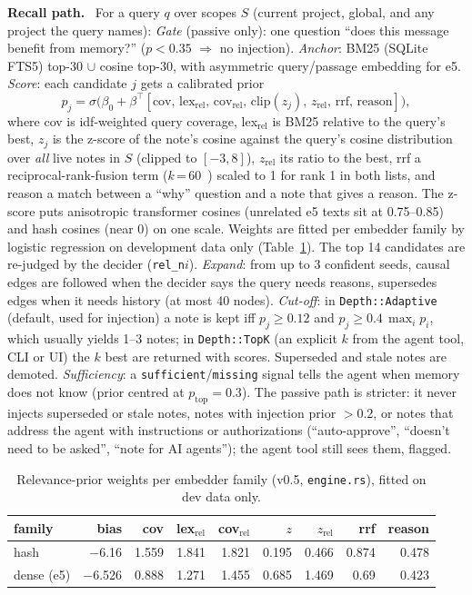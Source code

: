 \documentclass[10pt,twocolumn]{article}
\newcommand{\code}[1]{\texttt{\small #1}}
\newcommand{\para}[1]{\smallskip\noindent\textbf{#1}\ }
\begin{document}
\para{Recall path.} For a query $q$ over scopes $S$ (current project, global, and any project the query names):
\emph{Gate} (passive only): one question ``does this message benefit from memory?'' ($p<0.35$ $\Rightarrow$ no injection).
\emph{Anchor}: BM25 (SQLite FTS5) top-30 $\cup$ cosine top-30, with asymmetric query/passage embedding for e5.
\emph{Score}: each candidate $j$ gets a calibrated prior
\[
p_j=\sigma\!\big(\beta_0+\beta^\top[\text{cov},\,\text{lex}_{\text{rel}},\,\text{cov}_{\text{rel}},\,\text{clip}(z_j),\,z_{\text{rel}},\,\text{rrf},\,\text{reason}]\big),
\]
where cov is idf-weighted query coverage, lex$_{\text{rel}}$ is BM25 relative to the query's best, $z_j$ is the
z-score of the note's cosine against the query's cosine distribution over \emph{all} live notes in $S$ (clipped to
$[-3,8]$), $z_{\text{rel}}$ its ratio to the best, rrf a reciprocal-rank-fusion term ($k$\,=\,60~\cite{rrf}) scaled to 1
for rank 1 in both lists, and reason a match between a ``why'' question and a note that gives a reason. The z-score
puts anisotropic transformer cosines (unrelated e5 texts sit at 0.75--0.85) and hash cosines (near 0) on one scale.
Weights are fitted per embedder family by logistic regression on development data only
(Table~\ref{tab:weights}). The top 14 candidates are re-judged by the decider (\code{rel\_n$i$}).
\emph{Expand}: from up to 3 confident seeds, causal edges are followed when the decider says the query needs reasons,
supersedes edges when it needs history (at most 40 nodes).
\emph{Cut-off}: in \code{Depth::Adaptive} (default, used for injection) a note is kept iff $p_j\ge0.12$ and
$p_j\ge0.4\,\max_i p_i$, which usually yields 1--3 notes; in \code{Depth::TopK} (an explicit $k$ from the agent tool,
CLI or UI) the $k$ best are returned with scores. Superseded and stale notes are demoted.
\emph{Sufficiency}: a \code{sufficient}/\code{missing} signal tells the agent when memory does not know (prior centred at
$p_{\text{top}}=0.3$).
The passive path is stricter: it never injects superseded or stale notes, notes with injection prior $>0.2$, or notes
that address the agent with instructions or authorizations (``auto-approve'', ``doesn't need to be asked'', ``note for AI
agents''); the agent tool still sees them, flagged.

\begin{table}[t]
\centering\scriptsize
\caption{Relevance-prior weights per embedder family (v0.5, \code{engine.rs}), fitted on dev data only.}
\label{tab:weights}
\setlength{\tabcolsep}{2.6pt}
\begin{tabular}{@{}lrrrrrrrr@{}}
\toprule
family & bias & cov & lex$_{\text{rel}}$ & cov$_{\text{rel}}$ & $z$ & $z_{\text{rel}}$ & rrf & reason \\
\midrule
hash & $-$6.16 & 1.559 & 1.841 & 1.821 & 0.195 & 0.466 & 0.874 & 0.478 \\
dense (e5) & $-$6.526 & 0.888 & 1.271 & 1.455 & 0.685 & 1.469 & 0.69 & 0.423 \\
\bottomrule
\end{tabular}
\end{table}
\end{document}
